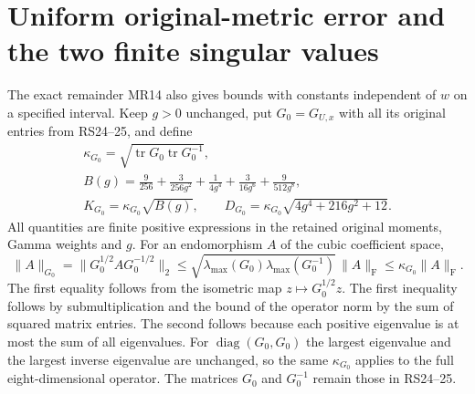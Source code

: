 \documentclass[11pt]{article}
\begin{document}
\section{Uniform original-metric error and the two finite singular values}
The exact remainder MR14 also gives bounds with constants
independent of $w$ on a specified interval. Keep $g>0$ unchanged,
put $G_0=G_{U,x}$ with all its original entries from RS24--25,
and define
\begin{equation}
 \begin{gathered}
 \kappa_{G_0}=
   \sqrt{\operatorname{tr}G_0\operatorname{tr}G_0^{-1}},\\
 B(g)=\frac9{256}+\frac3{256g^2}+\frac1{4g^4}
             +\frac3{16g^6}+\frac9{512g^8},\\
 K_{G_0}=\kappa_{G_0}\sqrt{B(g)},\qquad
 D_{G_0}=\kappa_{G_0}\sqrt{4g^4+216g^2+12}.
 \end{gathered}
 \tag{MR19}
\end{equation}
All quantities are finite positive expressions in the retained
original moments, Gamma weights and $g$. For an endomorphism
$A$ of the cubic coefficient space,
\[
 \|A\|_{G_0}
 =\|G_0^{1/2}AG_0^{-1/2}\|_2
 \le\sqrt{\lambda_{\max}(G_0)\lambda_{\max}(G_0^{-1})}
                 \,\|A\|_{\mathrm F}
 \le\kappa_{G_0}\|A\|_{\mathrm F}.
\]
The first equality follows from the isometric map
$z\mapsto G_0^{1/2}z$. The first inequality follows by
submultiplication and the bound of the operator norm by the
sum of squared matrix entries. The second follows because
each positive eigenvalue is at most the sum of all eigenvalues.
For $\operatorname{diag}(G_0,G_0)$ the largest eigenvalue and
the largest inverse eigenvalue are unchanged, so the same
$\kappa_{G_0}$ applies to the full eight-dimensional operator.
The matrices $G_0$ and $G_0^{-1}$ remain those in RS24--25.
\end{document}
